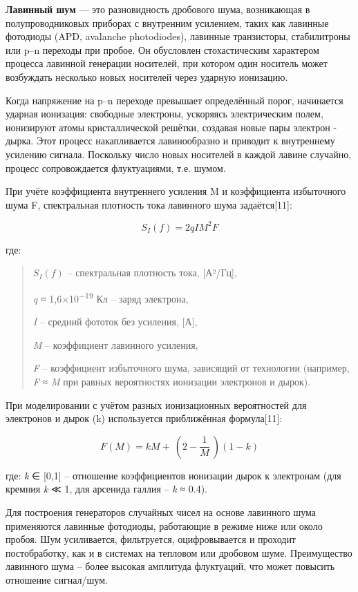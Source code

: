 \textbf{Лавинный шум} --- это разновидность дробового шума, возникающая
в полупроводниковых приборах с внутренним усилением, таких как лавинные
фотодиоды (APD, avalanche photodiodes), лавинные транзисторы,
стабилитроны или p--n переходы при пробое. Он обусловлен стохастическим
характером процесса лавинной генерации носителей, при котором один
носитель может возбуждать несколько новых носителей через ударную
ионизацию.

Когда напряжение на p--n переходе превышает определённый порог,
начинается ударная ионизация: свободные электроны, ускоряясь
электрическим полем, ионизируют атомы кристаллической решётки, создавая
новые пары электрон - дырка. Этот процесс накапливается лавинообразно и
приводит к внутреннему усилению сигнала. Поскольку число новых носителей
в каждой лавине случайно, процесс сопровождается флуктуациями, т.е.
шумом.

При учёте коэффициента внутреннего усиления M и коэффициента избыточного
шума F, спектральная плотность тока лавинного шума задаётся{[}11{]}:

\[S_{I}(f) = 2qIM^{2}F\]

где:

\begin{quote}
\(S_{I}(f)\) -- спектральная плотность тока, {[}А²/Гц{]},

\emph{q} ≈ 1,6×10\textsuperscript{−19} Кл -- заряд электрона,

\emph{I} -- средний фототок без усиления, {[}А{]},

\emph{M} -- коэффициент лавинного усиления,

\emph{F} -- коэффициент избыточного шума, зависящий от технологии
(например, \emph{F} ≈ \emph{M} при равных вероятностях ионизации
электронов и дырок).
\end{quote}

При моделировании с учётом разных ионизационных вероятностей для
электронов и дырок (k) используется приближённая формула{[}11{]}:

\[F(M) = kM + \left. \ \left( 2 - \frac{1}{M} \right.\  \right)(1 - k)\]

где: \emph{k} ∈ {[}0,1{]} -- отношение коэффициентов ионизации дырок к
электронам (для кремния \emph{k} ≪ 1, для арсенида галлия -- \emph{k} ≈
0.4).

Для построения генераторов случайных чисел на основе лавинного шума
применяются лавинные фотодиоды, работающие в режиме ниже или около
пробоя. Шум усиливается, фильтруется, оцифровывается и проходит
постобработку, как и в системах на тепловом или дробовом шуме.
Преимущество лавинного шума -- более высокая амплитуда флуктуаций, что
может повысить отношение сигнал/шум.

